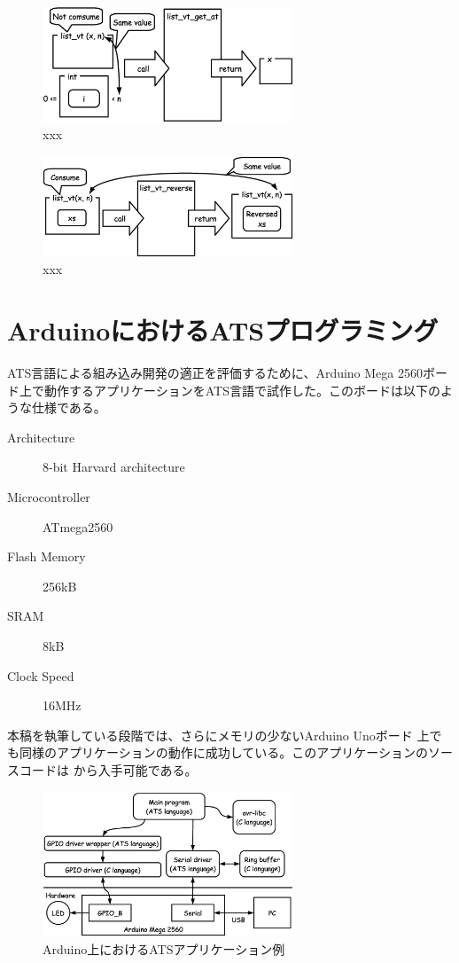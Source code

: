 \documentclass{ipsjprosym}
\begin{document}
\begin{figure}[h]
\centering
\includegraphics[width=75mm]{draw/list_vt_get_at.eps}
\caption{xxx}
\label{fig:xxx}
\end{figure}

\begin{figure}[h]
\centering
\includegraphics[width=75mm]{draw/list_vt_reverse.eps}
\caption{xxx}
\label{fig:xxx}
\end{figure}

\section{ArduinoにおけるATSプログラミング}

ATS言語による組み込み開発の適正を評価するために、Arduino Mega 2560ボード上で動作するアプリケーションをATS言語で試作した。このボードは以下のような仕様である。

\begin{description}
  \item[Architecture] 8-bit Harvard architecture
  \item[Microcontroller] ATmega2560
  \item[Flash Memory] 256kB
  \item[SRAM] 8kB
  \item[Clock Speed] 16MHz
\end{description}

本稿を執筆している段階では、さらにメモリの少ないArduino Unoボード \cite{arduino-uno} 上でも同様のアプリケーションの動作に成功している。このアプリケーションのソースコードは \cite{arduino-ats} から入手可能である。

\begin{figure}[h]
\centering
\includegraphics[width=75mm]{draw/demo_ats_arduino.eps}
\caption{Arduino上におけるATSアプリケーション例}
\label{fig:demo_ats_arduino}
\end{figure}
\end{document}

